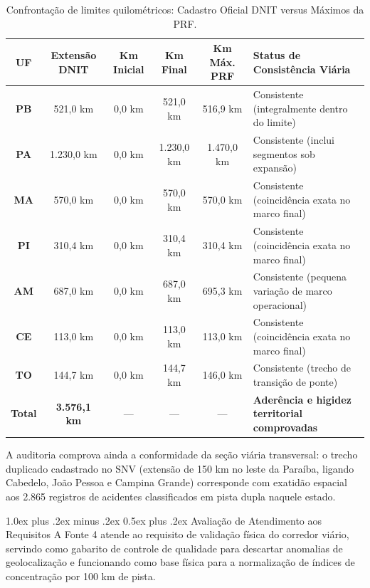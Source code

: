 \documentclass[11pt,a4paper]{article}
\makeatletter
\renewcommand\subsubsection{
\@startsection{subsubsection}{3}{0pt}%
{1.0ex plus .2ex minus .2ex}%
{0.5ex plus .2ex}%
{\normalfont\normalsize\bfseries}
}
\makeatother
\begin{document}
\begin{table}[H]
\centering
\small
\renewcommand{\arraystretch}{1.2}
\caption{Confrontação de limites quilométricos: Cadastro Oficial DNIT versus Máximos da PRF.}
\label{tab:desc_dnit}
\begin{tabularx}{\textwidth}{|c|c|c|c|c|X|}
\hline
\textbf{UF} & \textbf{Extensão DNIT} & \textbf{Km Inicial} & \textbf{Km Final} & \textbf{Km Máx. PRF} & \textbf{Status de Consistência Viária} \\
\hline
\textbf{PB} & 521,0 km & 0,0 km & 521,0 km & 516,9 km & Consistente (integralmente dentro do limite) \\
\hline
\textbf{PA} & 1.230,0 km & 0,0 km & 1.230,0 km & 1.470,0 km & Consistente (inclui segmentos sob expansão) \\
\hline
\textbf{MA} & 570,0 km & 0,0 km & 570,0 km & 570,0 km & Consistente (coincidência exata no marco final) \\
\hline
\textbf{PI} & 310,4 km & 0,0 km & 310,4 km & 310,4 km & Consistente (coincidência exata no marco final) \\
\hline
\textbf{AM} & 687,0 km & 0,0 km & 687,0 km & 695,3 km & Consistente (pequena variação de marco operacional) \\
\hline
\textbf{CE} & 113,0 km & 0,0 km & 113,0 km & 113,0 km & Consistente (coincidência exata no marco final) \\
\hline
\textbf{TO} & 144,7 km & 0,0 km & 144,7 km & 146,0 km & Consistente (trecho de transição de ponte) \\
\hline
\textbf{Total} & \textbf{3.576,1 km} & --- & --- & --- & \textbf{Aderência e higidez territorial comprovadas} \\
\hline
\end{tabularx}
\end{table}

A auditoria comprova ainda a conformidade da seção viária transversal: o trecho duplicado cadastrado no SNV (extensão de 150 km no leste da Paraíba, ligando Cabedelo, João Pessoa e Campina Grande) corresponde com exatidão espacial aos 2.865 registros de acidentes classificados em pista dupla naquele estado.

\subsubsection{Avaliação de Atendimento aos Requisitos}
A Fonte 4 atende ao requisito de validação física do corredor viário, servindo como gabarito de controle de qualidade para descartar anomalias de geolocalização e funcionando como base física para a normalização de índices de concentração por 100 km de pista.
\end{document}

